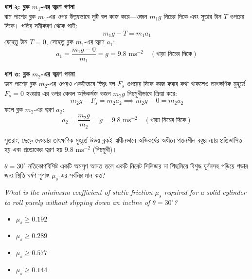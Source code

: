 \documentclass[12pt, a4paper]{article}
\begin{document}
{\begin{tcolorbox}[solutionbox={সমাধান (Solution)}]
\vspace{0.5em}
\noindent
\textbf{ধাপ ২: ব্লক $m_1$-এর ত্বরণ গণনা} \\
বাম পাশের ব্লক $m_1$-এর ওপর উল্লম্বভাবে দুটি বল কাজ করে—ওজন $m_1 g$ নিচের দিকে এবং সুতার টান $T$ ওপরের দিকে। গতির সমীকরণ থেকে পাই:
\[ m_1 g - T = m_1 a_1 \]
যেহেতু টান $T = 0$, সেহেতু ব্লক $m_1$-এর ত্বরণ $a_1$:
\[ a_1 = \frac{m_1 g - 0}{m_1} = g = 9.8\text{ ms}^{-2} \quad (\text{খাড়া নিচের দিকে}) \]

\vspace{0.5em}
\noindent
\textbf{ধাপ ৩: ব্লক $m_2$-এর ত্বরণ গণনা} \\
ডান পাশের ব্লক $m_2$-এর ওপরও একইভাবে স্প্রিং বল $F_s$ ওপরের দিকে কাজ করার কথা থাকলেও তাৎক্ষণিক মুহূর্তে $F_s = 0$ হওয়ায় এর ওপর কেবল অভিকর্ষজ ওজন $m_2 g$ নিম্নমুখীভাবে ক্রিয়া করে:
\[ m_2 g - F_s = m_2 a_2 \implies m_2 g - 0 = m_2 a_2 \]
ফলে ব্লক $m_2$-এর ত্বরণ $a_2$:
\[ a_2 = \frac{m_2 g}{m_2} = g = 9.8\text{ ms}^{-2} \quad (\text{খাড়া নিচের দিকে}) \]

সুতরাং, ছেড়ে দেওয়ার তাৎক্ষণিক মুহূর্তে উভয় ব্লকই স্বাধীনভাবে অভিকর্ষের অধীনে পতনশীল বস্তুর ন্যায় প্রতিভাসিত হয় এবং প্রত্যেকের ত্বরণ হয় $9.8\text{ ms}^{-2}$ (নিম্নমুখী)।
\end{tcolorbox}


\begin{tcolorbox}[questionbox={প্রশ্ন (Question) 9}]
\noindent
$\theta = 30^\circ$ নতিকোণবিশিষ্ট একটি অমসৃণ আনত তলে একটি নিরেট সিলিন্ডার না পিছলিয়ে বিশুদ্ধ ঘূর্ণনসহ গড়িয়ে পড়ার জন্য স্থিতি ঘর্ষণ গুণাঙ্ক $\mu_s$-এর সর্বনিম্ন মান কত?
\vspace{0.8em}
\begin{english}
\noindent\textit{\color{darkgray}
What is the minimum coefficient of static friction $\mu_s$ required for a solid cylinder to roll purely without slipping down an incline of $\theta = 30^\circ$?
}
\end{english}
\end{tcolorbox}

\begin{itemize}[label={}, leftmargin=1cm, itemsep=0.5em]
\item[\textbf{A)}] $\mu_s \ge 0.192$
\item[\textbf{B)}] $\mu_s \ge 0.289$
\item[\textbf{C)}] $\mu_s \ge 0.577$
\item[\textbf{D)}] $\mu_s \ge 0.144$
\end{itemize}
\vspace{0.5em}

}
\end{document}
